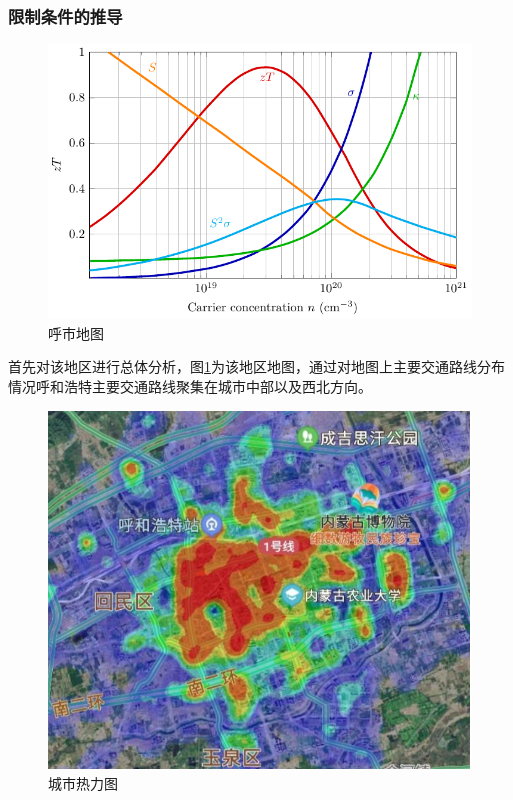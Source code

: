 \documentclass[12pt,a4paper]{mcmthesis}
\begin{document}
    \subsubsection{限制条件的推导}
    \begin{figure}[h!t]
        \centerline{\includegraphics[scale=0.6]{figures/fig1}\quad
        }
        \caption{\song\wuhao
        呼市地图}
        \label{fig:呼市地图}
    \end{figure}
    首先对该地区进行总体分析，图\ref{fig:呼市地图}为该地区地图，通过对地图上主要交通路线分布情况呼和浩特主要交通路线聚集在城市中部以及西北方向。
    \begin{figure}[h!t]
        \centerline{\includegraphics[scale=0.6]{figures/城市热力图}\quad
        }
        \caption{\song\wuhao
        城市热力图}
        \label{fig:城市热力图}
    \end{figure}
\end{document}
